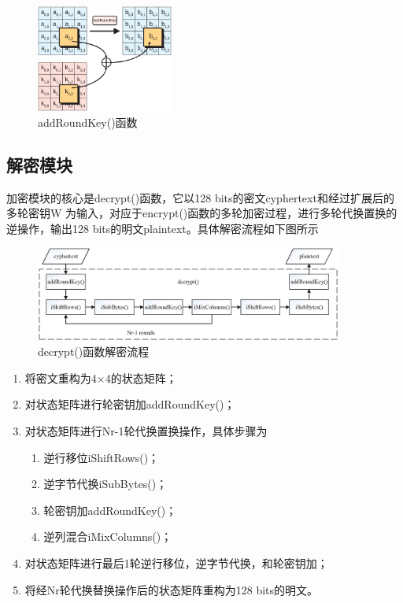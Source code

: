 \begin{figure}[h]
    \centering
    \includegraphics[width=0.4\textwidth,trim=0 10 0 0,clip]{./pic/addRoundKey.eps}
    \caption{addRoundKey()函数}
\end{figure}

\subsection{解密模块}

加密模块的核心是decrypt()函数，它以128 bits的密文cyphertext和经过扩展后的多轮密钥W 为输入，对应于encrypt()函数的多轮加密过程，进行多轮代换置换的逆操作，输出128 bits的明文plaintext。具体解密流程如下图所示

\begin{figure}[h]
    \centering
    \includegraphics[width=0.9\textwidth,trim=0 30 0 20,clip]{./pic/decrypt.eps}
    \caption{decrypt()函数解密流程}
\end{figure}

\begin{enumerate}
    \item 将密文重构为4$\times$4的状态矩阵；
    \item 对状态矩阵进行轮密钥加addRoundKey()；
    \item 对状态矩阵进行Nr-1轮代换置换操作，具体步骤为
    \begin{enumerate}
        \item 逆行移位iShiftRows()；
        \item 逆字节代换iSubBytes()；
        \item 轮密钥加addRoundKey()；
        \item 逆列混合iMixColumns()；
    \end{enumerate}
    \item 对状态矩阵进行最后1轮逆行移位，逆字节代换，和轮密钥加；
    \item 将经Nr轮代换替换操作后的状态矩阵重构为128 bits的明文。
\end{enumerate}

